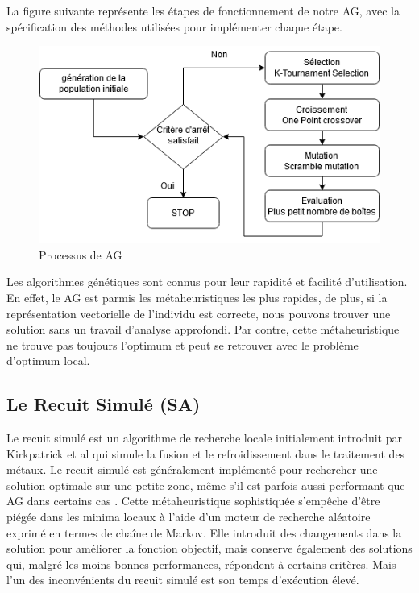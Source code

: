 \documentclass[preprint]{elsarticle}
\begin{document}
La figure suivante représente les étapes de fonctionnement de notre AG, avec la spécification des méthodes utilisées pour implémenter chaque étape. 

\begin{figure}[!h]
    \centering
    \includegraphics[scale=0.6]{./figures/AG schema.png}
    \caption{Processus de AG }
    \label{fig:agschema}
\end{figure}
Les algorithmes génétiques sont connus pour leur rapidité et facilité d’utilisation. 
En effet, le AG est parmis les métaheuristiques les plus rapides, de plus, si la représentation vectorielle de l'individu est correcte, nous pouvons trouver une solution sans un travail d'analyse approfondi. Par contre, cette métaheuristique ne trouve pas toujours l’optimum et peut se retrouver avec le problème d’optimum local. 

\subsection{Le Recuit Simulé (SA)}
Le recuit simulé est un algorithme de recherche locale initialement introduit par Kirkpatrick et al \cite{kirk} qui simule la fusion et le refroidissement dans le traitement des métaux. Le recuit simulé est généralement implémenté pour rechercher une solution optimale sur une petite zone, même s'il est parfois aussi performant que AG dans certains cas \cite{Alkhateeb}.
Cette métaheuristique sophistiquée s'empêche d'être piégée dans les minima locaux à l'aide d'un moteur de recherche aléatoire exprimé en termes de chaîne de Markov. Elle introduit des changements dans la solution pour améliorer la fonction objectif, mais conserve également des solutions qui, malgré les moins bonnes performances, répondent à certains critères. Mais l’un des inconvénients du recuit simulé est son temps d'exécution élevé. 
\end{document}
